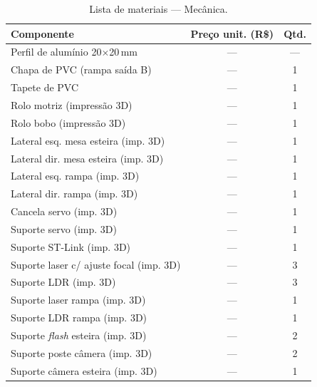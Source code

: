 \begin{table}[H]
\caption{Lista de materiais --- Mecânica.}
\label{tab:BOM_mec}
\centering
\renewcommand{\arraystretch}{0.85}
\small
\begin{tabular}{lcc}
\hline
\textbf{Componente} & \textbf{Preço unit. (R\$)} & \textbf{Qtd.} \\
\hline
Perfil de alumínio 20$\times$20\,mm    & ---   & ---  \\
Chapa de PVC (rampa saída B)           & ---   & 1    \\
Tapete de PVC                          & ---   & 1    \\
Rolo motriz (impressão 3D)             & ---   & 1    \\
Rolo bobo (impressão 3D)               & ---   & 1    \\
Lateral esq. mesa esteira (imp. 3D)    & ---   & 1    \\
Lateral dir. mesa esteira (imp. 3D)    & ---   & 1    \\
Lateral esq. rampa (imp. 3D)           & ---   & 1    \\
Lateral dir. rampa (imp. 3D)           & ---   & 1    \\
Cancela servo (imp. 3D)                & ---   & 1    \\
Suporte servo (imp. 3D)                & ---   & 1    \\
Suporte ST-Link (imp. 3D)              & ---   & 1    \\
Suporte laser c/ ajuste focal (imp. 3D)& ---   & 3    \\
Suporte LDR (imp. 3D)                  & ---   & 3    \\
Suporte laser rampa (imp. 3D)          & ---   & 1    \\
Suporte LDR rampa (imp. 3D)            & ---   & 1    \\
Suporte \textit{flash} esteira (imp. 3D)& ---  & 2    \\
Suporte poste câmera (imp. 3D)         & ---   & 2    \\
Suporte câmera esteira (imp. 3D)       & ---   & 1    \\
\hline
\end{tabular}
\end{table}